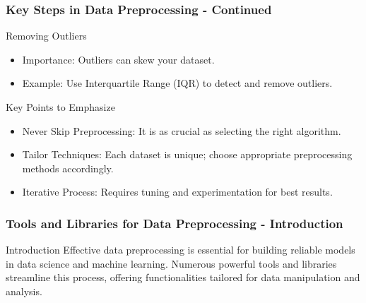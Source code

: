 \documentclass[aspectratio=169]{beamer}
\begin{document}
\begin{frame}[fragile]
    \frametitle{Key Steps in Data Preprocessing - Continued}
    
    \begin{block}{Removing Outliers}
        \begin{itemize}
            \item Importance: Outliers can skew your dataset.
            \item Example: Use Interquartile Range (IQR) to detect and remove outliers.
        \end{itemize}
    \end{block}

    \begin{block}{Key Points to Emphasize}
        \begin{itemize}
            \item Never Skip Preprocessing: It is as crucial as selecting the right algorithm.
            \item Tailor Techniques: Each dataset is unique; choose appropriate preprocessing methods accordingly.
            \item Iterative Process: Requires tuning and experimentation for best results.
        \end{itemize}
    \end{block}
\end{frame}

\begin{frame}[fragile]
    \frametitle{Tools and Libraries for Data Preprocessing - Introduction}
    \begin{block}{Introduction}
        Effective data preprocessing is essential for building reliable models in data science and machine learning. 
        Numerous powerful tools and libraries streamline this process, offering functionalities tailored for data manipulation and analysis.
    \end{block}
\end{frame}
\end{document}
